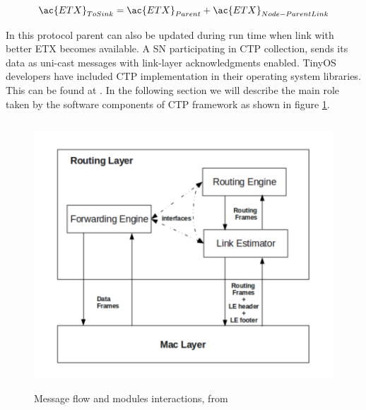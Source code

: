     \[ \ac{ETX}_{ToSink} = \ac{ETX}_{Parent} + \ac{ETX}_{Node-ParentLink} \] 

    In this protocol parent can also be updated during run time when link with better \ac{ETX} becomes available. A \ac{SN} participating in \ac{CTP} collection, sends its data as uni-cast messages with link-layer acknowledgments enabled. TinyOS developers have included \ac{CTP} implementation in their operating system libraries. This can be found at \cite{tinyOS:ctpImplementation}. In the following section we will describe the main role taken by the software components of \ac{CTP} framework as shown in figure \ref{fig:CTPFramework}.
	
	\begin{center}
    \begin{figure}[h]
    	\includegraphics[height=10cm]{gfx/MessageFlowandmodulesInteractions.png}
    	\caption{Message flow and modules interactions, from \cite{colesanti2010performance}}
    	\label{fig:CTPFramework}
    \end{figure}
    \end{center}
	
